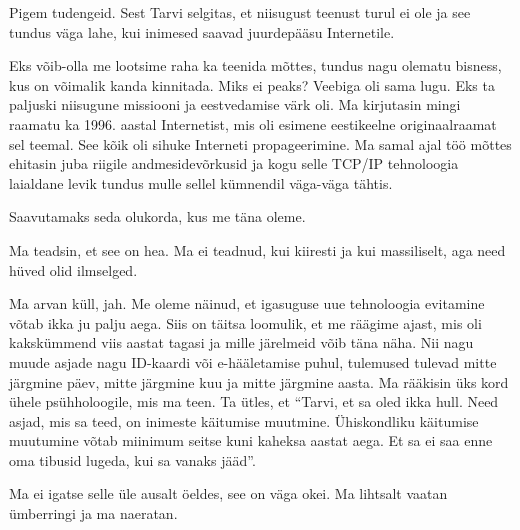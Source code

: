 
Pigem  tudengeid. Sest Tarvi selgitas, et niisugust teenust turul ei ole ja see tundus väga lahe, kui inimesed saavad juurdepääsu Internetile. 


Eks võib-olla me lootsime raha ka teenida mõttes, tundus nagu olematu bisness, kus on võimalik kanda kinnitada. Miks ei peaks? Veebiga oli sama lugu. Eks ta paljuski niisugune missiooni ja eestvedamise värk oli. Ma kirjutasin mingi raamatu ka 1996. aastal  Internetist, mis oli esimene eestikeelne originaalraamat sel teemal. See kõik oli sihuke Interneti propageerimine. Ma samal ajal  töö mõttes ehitasin juba riigile andmesidevõrkusid ja kogu selle TCP/IP tehnoloogia  laialdane levik tundus mulle sellel kümnendil väga-väga tähtis.


Saavutamaks seda olukorda, kus me täna oleme. 


Ma teadsin, et see on hea. Ma ei teadnud, kui kiiresti ja kui massiliselt, aga  need hüved olid ilmselged. 


Ma arvan küll, jah. Me oleme näinud, et igasuguse uue tehnoloogia evitamine võtab ikka ju palju aega. Siis on täitsa loomulik, et me räägime ajast, mis oli  kakskümmend viis aastat tagasi ja mille järelmeid võib täna näha. Nii nagu muude asjade nagu ID-kaardi  või e-hääletamise puhul,  tulemused tulevad  mitte järgmine päev, mitte järgmine kuu ja mitte järgmine aasta. Ma rääkisin üks kord ühele psühholoogile, mis ma teen. Ta ütles, et \enquote{Tarvi, et sa oled ikka hull. Need asjad, mis sa teed, on inimeste käitumise muutmine. Ühiskondliku käitumise muutumine võtab miinimum seitse kuni kaheksa aastat aega. Et sa ei saa enne oma tibusid lugeda, kui sa vanaks jääd}.


Ma ei igatse selle üle ausalt öeldes, see on väga okei. Ma lihtsalt vaatan ümberringi ja ma naeratan. 


